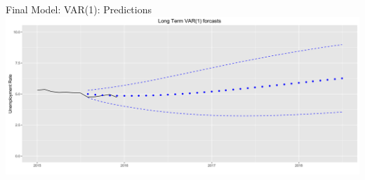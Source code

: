 \documentclass[ignorenonframetext]{beamer}
\begin{document}
  	\begin{frame}{Final Model: VAR(1): Predictions}
 \includegraphics[width=\textwidth]{images/zoomedvar}
  	\end{frame}
 
     
\end{document}
